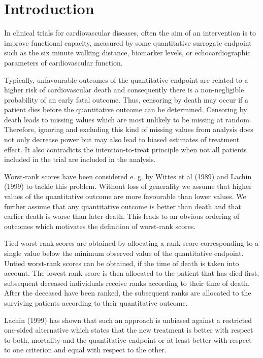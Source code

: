 \documentclass[bimj,fleqn]{w-art}\usepackage[]{graphicx}\usepackage[]{color}
\theoremstyle{plain}
\theoremstyle{definition}
\begin{document}



\section{Introduction}
\label{sec:Intro}

In clinical trials for cardiovascular diseases, often the aim of an
intervention is to improve functional capacity, measured by some quantitative
surrogate endpoint such as the six minute walking distance, biomarker levels,
or echocardiographic parameters of cardiovascular function.

Typically, unfavourable outcomes of the quantitative endpoint are related to a
higher risk of cardiovascular death and consequently there is a non-negligible
probability of an early fatal outcome. Thus, censoring by
death may occur if a patient dies before the quantitative outcome can be
determined. Censoring by death leads to missing values which are most unlikely
to be missing at random. Therefore, ignoring and excluding this kind of
missing values from analysis does not only decrease power but may also lead to
biased estimates of treatment effect. It also contradicts the
intention-to-treat principle when not all patients included in the trial are
included in the analysis.

Worst-rank scores have been considered e. g. by Wittes et al (1989) and Lachin
(1999) to tackle this problem. Without loss of generality we assume that
higher values of the quantitative outcome are more favourable than lower
values. We further assume that any quantitative outcome is better than death
and that earlier death is worse than later death. This leads to an obvious
ordering of outcomes which motivates the definition of worst-rank scores.

Tied worst-rank scores are obtained by allocating a rank score corresponding
to a single value below the minimum observed value of the quantitative
endpoint. Untied worst-rank scores can be obtained, if the time of death is
taken into account. The lowest rank score is then allocated to the patient
that has died first, subsequent deceased individuals receive ranks according
to their time of death. After the deceased have been ranked, the subsequent
ranks are allocated to the surviving patients according to their quantitative
outcome.

Lachin (1999) has shown that such an approach is unbiased against a restricted
one-sided alternative which states that the new treatment is better with
respect to both, mortality and the quantitative endpoint or at least better
with respect to one criterion and equal with respect to the other.
\end{document}
